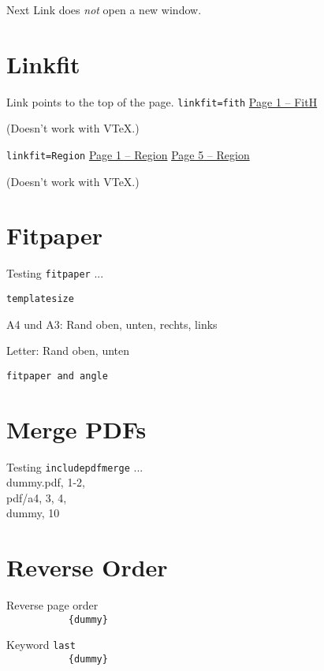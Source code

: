 \begingroup
Next Link does \emph{not} open a new window.

\endgroup

\section{Linkfit}
\begingroup
Link points to the top of the page. \texttt{linkfit=fith}
\hyperlink{dummy.pdf.1}{Page 1 -- FitH}
\par(Doesn't work with VTeX.)

\texttt{linkfit=Region}
\hyperlink{foobar.1}{Page 1 -- Region}
\hyperlink{foobar.5}{Page 5 -- Region}
\par(Doesn't work with VTeX.)

\endgroup

\section{Fitpaper}
\begingroup
Testing \texttt{fitpaper} ...

%
\texttt{templatesize}
\par A4 und A3: Rand oben, unten, rechts, links
\par Letter: Rand oben, unten

%
\texttt{fitpaper and angle}


\endgroup


\section{Merge PDFs}
\begingroup
Testing \texttt{includepdfmerge} ...
\\dummy.pdf, 1-2, \\pdf/a4, 3, 4, \\dummy, 10
\endgroup


\section{Reverse Order}
\begingroup
Reverse page order\\
\verb||
\verb|           {dummy}|

Keyword \verb|last|\\
\verb||
\verb|           {dummy}|

\endgroup


